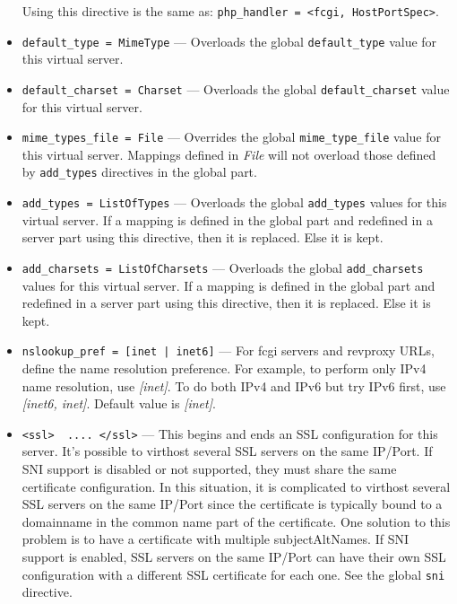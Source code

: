 \documentclass[11pt,oneside,english]{book}
\begin{document}
\begin{itemize}
              Using this directive is the same as:
              \verb+php_handler = <fcgi, HostPortSpec>+.

\item        \verb+default_type = MimeType+ ---
              Overloads the global \verb+default_type+ value for this virtual
              server.

\item        \verb+default_charset = Charset+ ---
              Overloads the global \verb+default_charset+ value for this virtual
              server.

\item        \verb+mime_types_file = File+ ---
              Overrides the global \verb+mime_type_file+ value for this virtual
              server. Mappings defined in \textit{File} will not overload those
              defined by \verb+add_types+ directives in the global part.

\item        \verb+add_types = ListOfTypes+ ---
               Overloads the global \verb+add_types+ values for this virtual
               server. If a mapping is defined in the global part and redefined
               in a server part using this directive, then it is replaced. Else
               it is kept.

\item        \verb+add_charsets = ListOfCharsets+ ---
              Overloads the global \verb+add_charsets+ values for this virtual
              server. If a mapping is defined in the global part and redefined
              in a server part using this directive, then it is replaced. Else
              it is kept.

\item        \verb+nslookup_pref = [inet | inet6]+ ---
              For fcgi servers and revproxy URLs, define the name
              resolution preference. For example, to perform only IPv4
              name resolution, use \textit{[inet]}. To do both IPv4
              and IPv6 but try IPv6 first, use \textit{[inet6, inet]}.
              Default value is \textit{[inet]}.

\item        \verb+<ssl>  .... </ssl>+ ---
               This begins and ends an SSL configuration for this server. It's
               possible to virthost several SSL servers on the same IP/Port. If
               SNI support is disabled or not supported, they must share the
               same certificate configuration. In this situation, it is
               complicated to virthost several SSL servers on the same IP/Port
               since the certificate is typically bound to a domainname in the
               common name part of the certificate. One solution to this problem
               is to have a certificate with multiple subjectAltNames. If SNI
               support is enabled, SSL servers on the same IP/Port can have
               their own SSL configuration with a different SSL certificate for
               each one. See the global \verb+sni+ directive.


\end{itemize}
\end{document}
